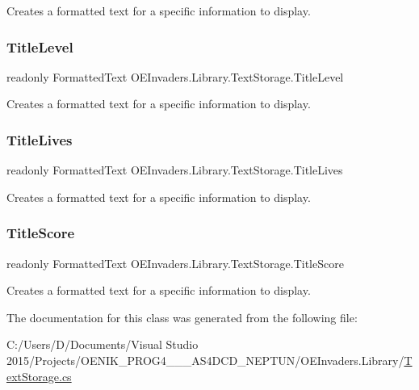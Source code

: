Creates a formatted text for a specific information to display. 

\mbox{\label{class_o_e_invaders_1_1_library_1_1_text_storage_a4d4079c92d3d04778544e5f63911a39d}} 
\subsubsection{\texorpdfstring{TitleLevel}{TitleLevel}}
{\footnotesize\ttfamily readonly Formatted\+Text O\+E\+Invaders.\+Library.\+Text\+Storage.\+Title\+Level}



Creates a formatted text for a specific information to display. 

\mbox{\label{class_o_e_invaders_1_1_library_1_1_text_storage_a95d39ac3053701180cd99e50731f012e}} 
\subsubsection{\texorpdfstring{TitleLives}{TitleLives}}
{\footnotesize\ttfamily readonly Formatted\+Text O\+E\+Invaders.\+Library.\+Text\+Storage.\+Title\+Lives}



Creates a formatted text for a specific information to display. 

\mbox{\label{class_o_e_invaders_1_1_library_1_1_text_storage_adbb09c95fa6ffbb409e3dffb5a3b664f}} 
\subsubsection{\texorpdfstring{TitleScore}{TitleScore}}
{\footnotesize\ttfamily readonly Formatted\+Text O\+E\+Invaders.\+Library.\+Text\+Storage.\+Title\+Score}



Creates a formatted text for a specific information to display. 



The documentation for this class was generated from the following file\+:\begin{DoxyCompactItemize}
\item 
C\+:/\+Users/\+D/\+Documents/\+Visual Studio 2015/\+Projects/\+O\+E\+N\+I\+K\+\_\+\+P\+R\+O\+G4\+\_\+\_\+\_\+\+A\+S4\+D\+C\+D\+\_\+\+N\+E\+P\+T\+U\+N/\+O\+E\+Invaders.\+Library/\mbox{\hyperlink{_text_storage_8cs}{Text\+Storage.\+cs}}\end{DoxyCompactItemize}
